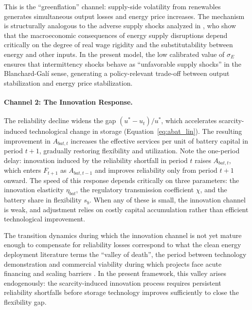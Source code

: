 \documentclass[12pt, a4paper]{article}
\begin{document}
	This is the ``greenflation'' channel: supply-side volatility from renewables generates simultaneous output losses and energy price increases. The mechanism is structurally analogous to the adverse supply shocks analyzed in \citet{blanchard2007}, who show that the macroeconomic consequences of energy supply disruptions depend critically on the degree of real wage rigidity and the substitutability between energy and other inputs. In the present model, the low calibrated value of $\sigma_E$ ensures that intermittency shocks behave as ``unfavorable supply shocks'' in the Blanchard-Gal\'{i} sense, generating a policy-relevant trade-off between output stabilization and energy price stabilization.
	
	\paragraph{Channel 2: The Innovation Response.}
	The reliability decline widens the gap $(u^* - u_t)/u^*$, which accelerates scarcity-induced technological change in storage (Equation~\ref{eq:abat_lin}). The resulting improvement in $A_{bat,t}$ increases the effective services per unit of battery capital in period $t+1$, gradually restoring flexibility and utilization. Note the one-period delay: innovation induced by the reliability shortfall in period $t$ raises $A_{bat,t}$, which enters $F_{t+1}$ as $A_{bat,t-1}$ and improves reliability only from period $t+1$ onward. The speed of this response depends critically on three parameters: the innovation elasticity $\eta_{bat}$, the regulatory transmission coefficient $\chi$, and the battery share in flexibility $s_b$. When any of these is small, the innovation channel is weak, and adjustment relies on costly capital accumulation rather than efficient technological improvement.
	
	The transition dynamics during which the innovation channel is not yet mature enough to compensate for reliability losses correspond to what the clean energy deployment literature terms the ``valley of death'', the period between technology demonstration and commercial viability during which projects face acute financing and scaling barriers \citep{nemet2018}. In the present framework, this valley arises endogenously: the scarcity-induced innovation process requires persistent reliability shortfalls before storage technology improves sufficiently to close the flexibility gap.
	
\end{document}

